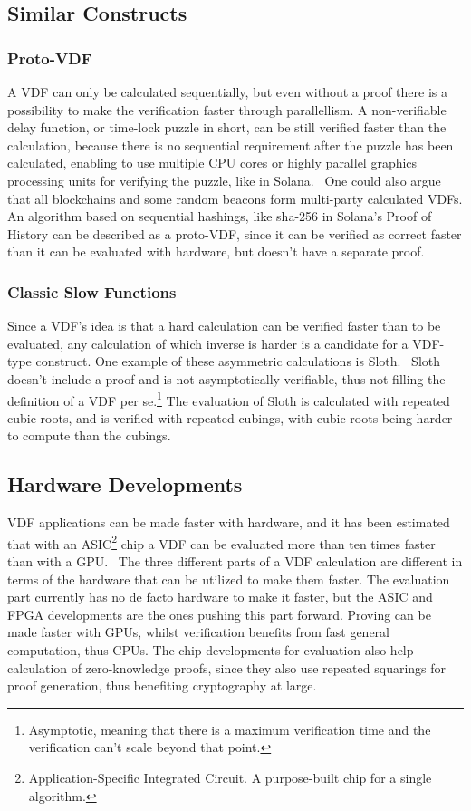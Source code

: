 \subsection{Similar Constructs}
\subsubsection{Proto-VDF}
A VDF can only be calculated sequentially, but even without a proof there is a possibility to make the verification faster through parallellism. A non-verifiable delay function, or time-lock puzzle in short, can be still verified faster than the calculation, because there is no sequential requirement after the puzzle has been calculated, enabling to use multiple CPU cores or highly parallel graphics processing units for verifying the puzzle, like in Solana.~\cite{Yakovenko2018-zn} One could also argue that all blockchains and some random beacons form multi-party calculated VDFs. An algorithm based on sequential hashings, like sha-256 in Solana's Proof of History can be described as a proto-VDF, since it can be verified as correct faster than it can be evaluated with hardware, but doesn't have a separate proof.

\subsubsection{Classic Slow Functions}
Since a VDF's idea is that a hard calculation can be verified faster than to be evaluated, any calculation of which inverse is harder is a candidate for a VDF-type construct. One example of these asymmetric calculations is Sloth.~\cite{Boneh2018-sm} Sloth doesn't include a proof and is not asymptotically verifiable, thus not filling the definition of a VDF per se.\footnote{Asymptotic, meaning that there is a maximum verification time and the verification can't scale beyond that point.} The evaluation of Sloth is calculated with repeated cubic roots, and is verified with repeated cubings, with cubic roots being harder to compute than the cubings.

\subsection{Hardware Developments}
VDF applications can be made faster with hardware, and it has been estimated that with an ASIC\footnote{Application-Specific Integrated Circuit. A purpose-built chip for a single algorithm.} chip a VDF can be evaluated more than ten times faster than with a GPU.~\cite{Stanford_Video2020-ap}
The three different parts of a VDF calculation are different in terms of the hardware that can be utilized to make them faster. The evaluation part currently has no de facto hardware to make it faster, but the ASIC and FPGA developments are the ones pushing this part forward. Proving can be made faster with GPUs, whilst verification benefits from fast general computation, thus CPUs.\cite{Protocol_Labs_Kelly_Olson2020-au} The chip developments for evaluation also help calculation of zero-knowledge proofs, since they also use repeated squarings for proof generation, thus benefiting cryptography at large.

